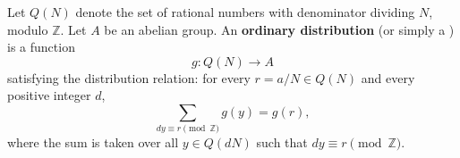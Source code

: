 Let $Q(N)$ denote the set of rational numbers with denominator dividing $N$, modulo $\mathbb{Z}$. Let $A$ be an abelian group. An \textbf{ordinary distribution} (or simply a ) is a function
$$g: Q(N) \to A$$
satisfying the distribution relation: for every $r = a/N \in Q(N)$ and every positive integer $d$,
$$\sum_{dy \equiv r \pmod{\mathbb{Z}}} g(y) = g(r),$$
where the sum is taken over all $y \in Q(dN)$ such that $dy \equiv r \pmod{\mathbb{Z}}$.
